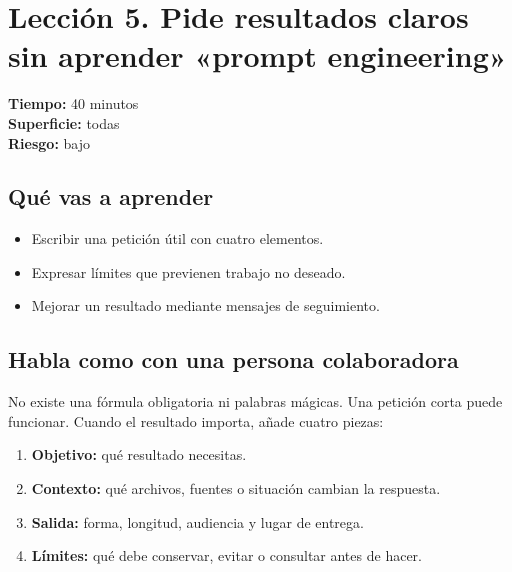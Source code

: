 \documentclass[10pt,a4paper,openany]{book}
\providecommand{\tightlist}{\setlength{\itemsep}{0.18em}\setlength{\parskip}{0pt}}
\begin{document}
\section{Lección 5. Pide resultados claros sin aprender «prompt
engineering»}\label{lecciuxf3n-5.-pide-resultados-claros-sin-aprender-prompt-engineering}

\begin{metabox}

\textbf{Tiempo:} 40 minutos\\
\textbf{Superficie:} todas\\
\textbf{Riesgo:} bajo

\end{metabox}

\subsection{Qué vas a aprender}\label{quuxe9-vas-a-aprender-4}

\begin{itemize}
\tightlist
\item
  Escribir una petición útil con cuatro elementos.
\item
  Expresar límites que previenen trabajo no deseado.
\item
  Mejorar un resultado mediante mensajes de seguimiento.
\end{itemize}

\subsection{Habla como con una persona
colaboradora}\label{habla-como-con-una-persona-colaboradora}

No existe una fórmula obligatoria ni palabras mágicas. Una petición
corta puede funcionar. Cuando el resultado importa, añade cuatro piezas:

\begin{enumerate}
\def\labelenumi{\arabic{enumi}.}
\tightlist
\item
  \textbf{Objetivo:} qué resultado necesitas.
\item
  \textbf{Contexto:} qué archivos, fuentes o situación cambian la
  respuesta.
\item
  \textbf{Salida:} forma, longitud, audiencia y lugar de entrega.
\item
  \textbf{Límites:} qué debe conservar, evitar o consultar antes de
  hacer.
\end{enumerate}
\end{document}
